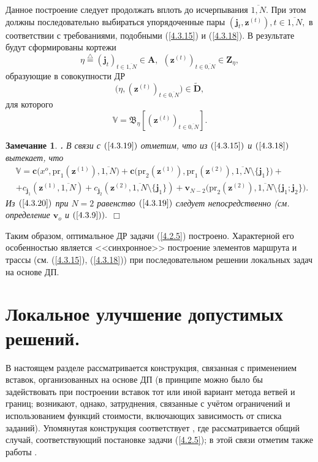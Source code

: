 \documentclass[11pt,twoside]{report}
\newcommand{\bfn}{\begin{equation}}
\newcommand{\efn}{\end{equation}}
\newcommand{\df}{\stackrel{\triangle}{=}}
\newcommand{\ov}{\overline}
\newcounter{theo}
\newcounter{zam}
\newtheorem{zam}{Замечание}[section]
\newcommand{\TL}{\mbox{\bf{$\!\!$.}}}
\newcommand{\sm}{\setminus}
\begin{document}
{$$$$
Данное построение следует продолжать вплоть до исчерпывания $\ov{1,N}.$ При этом должны
последовательно выбираться упорядоченные пары $(\mathbf{j}_t,\mathbf{z}^{(t)}), t\in \ov{1,N},$
в соответствии с требованиями, подобными (\ref{4.3.15}) и (\ref{4.3.18}). В результате будут
сформированы кортежи
$$\eta\df (\mathbf{j}_t)_{t\in\ov{1,N}}\in \mathbf{A},\ \ (\mathbf{z}^{(t)})_{t\in \ov{0,N}}\in \mathbf{Z}_\eta,
$$
образующие в совокупности ДР
$$\bigl(\eta, (\mathbf{z}^{(t)})_{t\in \ov{0,N}}\bigl)\in \widetilde{\mathbf{D}},
$$
для которого
\bfn\label{4.3.19} \mathbb{V}= \mathfrak{B}_\eta[(\mathbf{z}^{(t)})_{t\in \ov{0,N}}].
\efn
\begin{zam}\label{z4.3.1}{\TL}
 В связи с $(\ref{4.3.19})$ отметим, что из $(\ref{4.3.15})$ и $(\ref{4.3.18})$ вытекает, что
\begin{eqnarray}
& \mathbb{V}=\mathbf{c}\bigl(x^o,\mathrm{pr}_1(\mathbf{z}^{(1)}),\ov{1,N}\bigl) +
\mathbf{c}\bigl(\mathrm{pr}_2(\mathbf{z}^{(1)}), \mathrm{pr}_1(\mathbf{z}^{(2)}),\ov{1,N}\sm
\{\mathbf{j}_1\}) +
&\nonumber\\
&+  c_{\mathbf{j}_1}(\mathbf{z}^{(1)},\ov{1,N}) +
c_{\mathbf{j}_2}(\mathbf{z}^{(2)},
\ov{1,N}\sm\{\mathbf{j}_1 \}) +
\mathbf{v}_{N-2}\bigl(\mathrm{pr}_2(\mathbf{z}^{(2)}),\ov{1,N}\sm\{\mathbf{j}_1;\mathbf{j}_2\}\bigl).
&\label{4.3.20}
\end{eqnarray}
 Из $(\ref{4.3.20})$ при $N=2$ равенство $(\ref{4.3.19})$ следует непосредственно (см.
определение $\mathbf{v}_o$ и $(\ref{4.3.9})).$
 \hfill $\Box$
 \end{zam}

Таким образом, оптимальное ДР задачи (\ref{4.2.5}) построено. Характерной его особенностью является
<<синхронное>> построение элементов маршрута и трассы (см. (\ref{4.3.15}), (\ref{4.3.18})) при
последовательном решении локальных задач на основе ДП.


\section{Локальное улучшение допустимых решений.}
\setcounter{equation}{0}

В настоящем разделе рассматривается конструкция, связанная с применением вставок,
организованных на основе ДП (в принципе можно было бы задействовать при построении
вставок тот или иной вариант метода ветвей и границ; возникают, однако, затруднения,
связанные с учётом ограничений и использованием функций стоимости, включающих
зависимость от списка заданий). Упомянутая конструкция соответствует  \cite{Cha13`},
где рассматривается общий случай, соответствующий постановке задачи (\ref{4.2.5});
в этой связи отметим также работы   \cite{Cha14`,Cha15`}.

}
\end{document}
